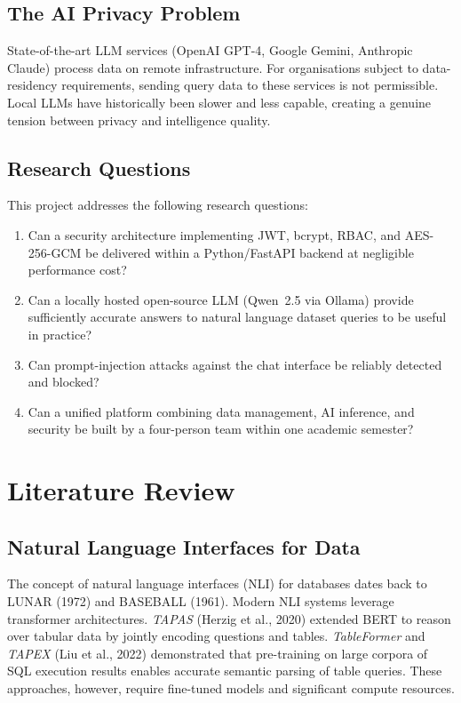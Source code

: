 \documentclass[12pt,a4paper]{report}
\begin{document}
\section{The AI Privacy Problem}

State-of-the-art LLM services (OpenAI GPT-4, Google Gemini, Anthropic Claude) process data on remote infrastructure. For organisations subject to data-residency requirements, sending query data to these services is not permissible. Local LLMs have historically been slower and less capable, creating a genuine tension between privacy and intelligence quality.

\section{Research Questions}

This project addresses the following research questions:

\begin{enumerate}[leftmargin=2em]
    \item Can a security architecture implementing JWT, bcrypt, RBAC, and AES-256-GCM be delivered within a Python/FastAPI backend at negligible performance cost?
    \item Can a locally hosted open-source LLM (Qwen~2.5 via Ollama) provide sufficiently accurate answers to natural language dataset queries to be useful in practice?
    \item Can prompt-injection attacks against the chat interface be reliably detected and blocked?
    \item Can a unified platform combining data management, AI inference, and security be built by a four-person team within one academic semester?
\end{enumerate}

\chapter{Literature Review}

\section{Natural Language Interfaces for Data}

The concept of natural language interfaces (NLI) for databases dates back to LUNAR (1972) and BASEBALL (1961). Modern NLI systems leverage transformer architectures. \textit{TAPAS} (Herzig et al., 2020) extended BERT to reason over tabular data by jointly encoding questions and tables. \textit{TableFormer} and \textit{TAPEX} (Liu et al., 2022) demonstrated that pre-training on large corpora of SQL execution results enables accurate semantic parsing of table queries. These approaches, however, require fine-tuned models and significant compute resources.
\end{document}
